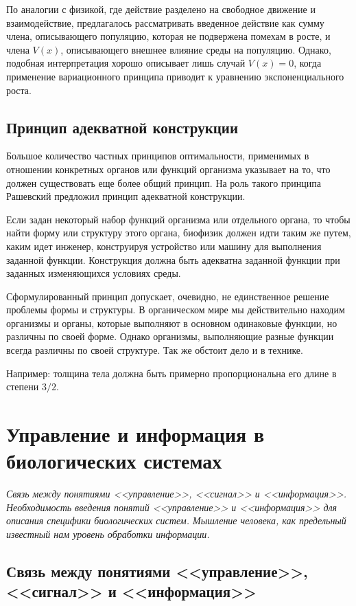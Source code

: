 \documentclass[12pt,a4paper,oneside]{book}
\begin{document}
По аналогии с физикой, где действие разделено на свободное движение и взаимодействие, предлагалось рассматривать введенное действие как сумму члена, описывающего популяцию, которая не подвержена помехам в росте, и члена $V(x)$, описывающего внешнее влияние среды на популяцию. Однако, подобная интерпретация хорошо описывает лишь случай $V(x) = 0$, когда применение вариационного принципа приводит к уравнению экспоненциального роста.


\subsection{Принцип адекватной конструкции}

Большое количество частных принципов оптимальности, применимых в отношении конкретных органов или функций организма указывает на то, что должен существовать еще более общий принцип. На роль такого принципа Рашевский предложил принцип адекватной конструкции.

Если задан некоторый набор функций организма или отдельного органа, то чтобы найти форму или структуру этого органа, биофизик должен идти таким же путем, каким идет инженер, конструируя устройство или машину для выполнения заданной функции. Конструкция должна быть адекватна заданной функции при заданных изменяющихся условиях среды.

Сформулированный принцип допускает, очевидно, не единственное решение проблемы формы и структуры. В органическом мире мы действительно находим организмы и органы, которые выполняют в основном одинаковые функции, но различны по своей форме. Однако организмы, выполняющие разные функции всегда различны по своей структуре. Так же обстоит дело и в технике.

Например: толщина тела должна быть примерно пропорциональна его длине в степени $3/2$. 



\newpage
\section{Управление и информация в биологических системах}
{\it Связь между понятиями <<управление>>, <<сигнал>> и <<информация>>. Необходимость введения понятий <<управление>> и <<информация>> для описания специфики биологических систем. Мышление человека, как предельный известный нам уровень обработки информации.}

\subsection{Связь между понятиями <<управление>>, <<сигнал>> и <<информация>>}
\end{document}
